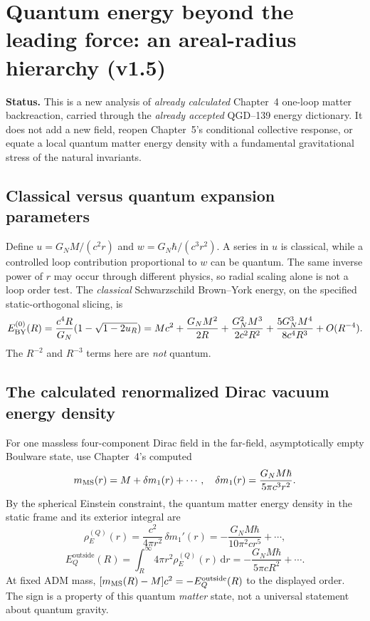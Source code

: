 \documentclass[11pt,a4paper]{article}
\theoremstyle{definition}\newtheorem{definition}[theorem]{Definition}
\theoremstyle{remark}\newtheorem{remark}[theorem]{Remark}
\newcommand{\dd}{\mathrm d}
\begin{document}
\section{Quantum energy beyond the leading force: an areal-radius hierarchy (v1.5)}
\label{sec:v15-energyhierarchy}
\textbf{Status.} This is a new analysis of \emph{already calculated}
Chapter~4 one-loop matter backreaction, carried through the \emph{already
accepted} QGD--139 energy dictionary. It does not add a new field,
reopen Chapter~5's conditional collective response, or equate a local
quantum matter energy density with a fundamental gravitational stress
of the natural invariants.

\subsection{Classical versus quantum expansion parameters}
Define $u=G_NM/(c^2r)$ and $w=G_N\hbar/(c^3r^2)$.
A series in $u$ is classical, while a controlled loop contribution
proportional to $w$ can be quantum. The same inverse power of $r$ may
occur through different physics, so radial scaling alone is not a loop
order test.
The \emph{classical} Schwarzschild Brown--York energy, on the
specified static-orthogonal slicing, is
\begin{equation}\label{eq:v15-BYclassical}
 E_{\rm BY}^{(0)}(R)
 =\frac{c^4R}{G_N}(1-\sqrt{1-2u_R})
 =Mc^2+\frac{G_NM^2}{2R}
 +\frac{G_N^2M^3}{2c^2R^2}
 +\frac{5G_N^3M^4}{8c^4R^3}+O(R^{-4}).
\end{equation}
The $R^{-2}$ and $R^{-3}$ terms here are \emph{not} quantum.

\subsection{The calculated renormalized Dirac vacuum energy density}
For one massless four-component Dirac field in the far-field,
asymptotically empty Boulware state, use Chapter~4's computed
\begin{equation}\label{eq:v15-deltam}
 m_{\rm MS}(r)=M+\delta m_1(r)+\cdots,
 \quad\delta m_1(r)=\frac{G_NM\hbar}{5\pi c^3r^2}.
\end{equation}
By the spherical Einstein constraint, the quantum matter energy density
in the static frame and its exterior integral are
\begin{equation}\label{eq:v15-rhoE}
 \boxed{\rho_E^{(Q)}(r)
 =\frac{c^2}{4\pi r^2}\,\delta m_1'(r)
 =-\frac{G_NM\hbar}{10\pi^2 c r^5}+\cdots,}
\end{equation}
\begin{equation}\label{eq:v15-Eoutside}
 \boxed{E_Q^{\mathrm{outside}}(R)
 =\int_R^\infty4\pi r^2\rho_E^{(Q)}(r)\,\dd r
 =-\frac{G_NM\hbar}{5\pi cR^2}+\cdots.}
\end{equation}
At fixed ADM mass, $[m_{\rm MS}(R)-M]c^2=-E_Q^{\rm outside}(R)$
to the displayed order. The sign is a property of this quantum
\emph{matter} state, not a universal statement about quantum gravity.
\end{document}
